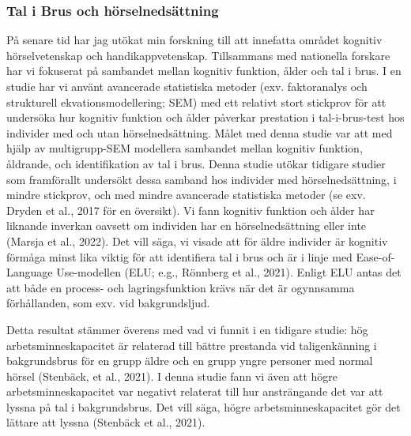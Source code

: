 \documentclass[]{article}
\begin{document}
\hypertarget{tal-i-brus-och-huxf6rselnedsuxe4ttning}{%
\subsubsection{Tal i Brus och
hörselnedsättning}\label{tal-i-brus-och-huxf6rselnedsuxe4ttning}}

På senare tid har jag utökat min forskning till att innefatta området
kognitiv hörselvetenskap och handikappvetenskap. Tillsammans med
nationella forskare har vi fokuserat på sambandet mellan kognitiv
funktion, ålder och tal i brus. I en studie har vi använt avancerade
statistiska metoder (exv. faktoranalys och strukturell
ekvationsmodellering; SEM) med ett relativt stort stickprov för att
undersöka hur kognitiv funktion och ålder påverkar prestation i
tal-i-brus-test hos individer med och utan hörselnedsättning. Målet med
denna studie var att med hjälp av multigrupp-SEM modellera sambandet
mellan kognitiv funktion, åldrande, och identifikation av tal i brus.
Denna studie utökar tidigare studier som framförallt undersökt dessa
samband hos individer med hörselnedsättning, i mindre stickprov, och med
mindre avancerade statistiska metoder (se exv. Dryden et al., 2017 för
en översikt). Vi fann kognitiv funktion och ålder har liknande inverkan
oavsett om individen har en hörselnedsättning eller inte (Marsja et al.,
2022). Det vill säga, vi visade att för äldre individer är kognitiv
förmåga minst lika viktig för att identifiera tal i brus och är i linje
med Ease-of-Language Use-modellen (ELU; e.g., Rönnberg et al., 2021).
Enligt ELU antas det att både en process- och lagringsfunktion krävs när
det är ogynnsamma förhållanden, som exv. vid bakgrundsljud.

Detta resultat stämmer överens med vad vi funnit i en tidigare studie:
hög arbetsminneskapacitet är relaterad till bättre prestanda vid
taligenkänning i bakgrundsbrus för en grupp äldre och en grupp yngre
personer med normal hörsel (Stenbäck, et al., 2021). I denna studie fann
vi även att högre arbetsminneskapacitet var negativt relaterat till hur
ansträngande det var att lyssna på tal i bakgrundsbrus. Det vill säga,
högre arbetsminneskapacitet gör det lättare att lyssna (Stenbäck et al.,
2021).
\end{document}
